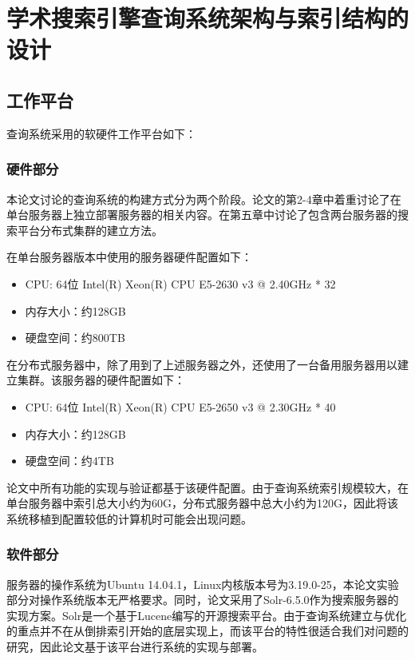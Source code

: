 
\chapter{学术搜索引擎查询系统架构与索引结构的设计}
\label{chap:c2}
\section{工作平台}
    查询系统采用的软硬件工作平台如下：
    \subsection{硬件部分}
        本论文讨论的查询系统的构建方式分为两个阶段。论文的第2-4章中着重讨论了在单台服务器上独立部署服务器的相关内容。在第五章中讨论了包含两台服务器的搜索平台分布式集群的建立方法。
        
        在单台服务器版本中使用的服务器硬件配置如下：
        \begin{itemize}
        \item CPU: 64位 Intel(R) Xeon(R) CPU E5-2630 v3 @ 2.40GHz * 32
        \item 内存大小：约128GB
        \item 硬盘空间：约800TB
        \end{itemize}
        在分布式服务器中，除了用到了上述服务器之外，还使用了一台备用服务器用以建立集群。该服务器的硬件配置如下：
        \begin{itemize}
        \item CPU: 64位 Intel(R) Xeon(R) CPU E5-2650 v3 @ 2.30GHz * 40
        \item 内存大小：约128GB
        \item 硬盘空间：约4TB
        \end{itemize}
        论文中所有功能的实现与验证都基于该硬件配置。由于查询系统索引规模较大，在单台服务器中索引总大小约为60G，分布式服务器中总大小约为120G，因此将该系统移植到配置较低的计算机时可能会出现问题。
    \subsection{软件部分}
        服务器的操作系统为Ubuntu 14.04.1，Linux内核版本号为3.19.0-25，本论文实验部分对操作系统版本无严格要求。同时，论文采用了Solr-6.5.0作为搜索服务器的实现方案。Solr是一个基于Lucene编写的开源搜索平台。由于查询系统建立与优化的重点并不在从倒排索引开始的底层实现上，而该平台的特性很适合我们对问题的研究，因此论文基于该平台进行系统的实现与部署。

